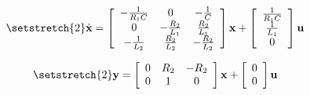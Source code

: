 \[ \setstretch{2}
  \dot{\textbf{x}}=
  \left[
    {\begin{array}{ccc}
      -\frac{1}{R_1 C} & 0                & -\frac{1}{C} \\
      0                & -\frac{R_2}{L_1} & \frac{R_2}{L_1} \\
      -\frac{1}{L_2}   & \frac{R_2}{L_2}  & -\frac{R_2}{L_2} \\
    \end{array}}
  \right]
  \textbf{x} +
  \left[
    {\begin{array}{cc}
      \frac{1}{R_1 C} \\
      \frac{1}{L_1} \\
      0 \\
    \end{array}}
  \right]
  \textbf{u}
\]

\[ \setstretch{2}
  \textbf{y}=
  \left[
    {\begin{array}{ccc}
      0 & R_2     & -R_2 \\
      0 & 1       & 0 \\
    \end{array}}
  \right]
  \textbf{x} +
  \left[
    {\begin{array}{cc}
      0 \\
      0 \\
    \end{array}}
  \right]
  \textbf{u}
\]
